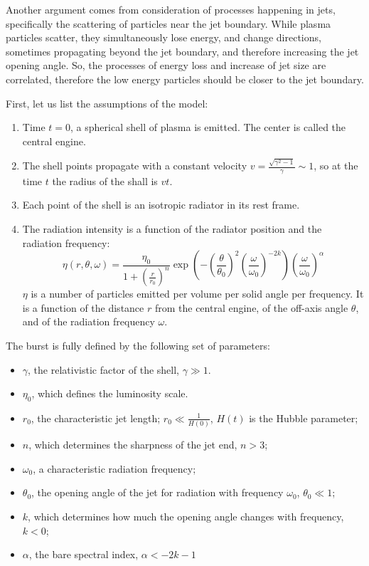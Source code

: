 \documentclass[manuscript]{aastex}
\begin{document}
Another argument comes from consideration of processes happening in
jets, specifically the scattering of particles near the jet boundary.
While plasma particles scatter, they simultaneously lose energy, and
change directions, sometimes propagating beyond the jet boundary, and
therefore increasing the jet opening angle.  So, the processes of
energy loss and increase of jet size are correlated, therefore the low
energy particles should be closer to the jet boundary.

First, let us list the assumptions of the model:

\begin{enumerate}
\item{Time $t = 0$, a spherical shell of plasma is emitted. The center
  is called the central engine.}
\item{The shell points propagate with a constant velocity $v =
  \frac{\sqrt{\gamma^2 - 1}}{\gamma} \sim 1$, so at the time $t$ the
  radius of the shall is $v t$.}
\item{Each point of the shell is an isotropic radiator in its rest
  frame.}
\item{ The radiation intensity is a function of the radiator position
  and the radiation frequency:
	\begin{equation}\label{eq:eta}
		\eta\left(r,\theta,\omega\right) = 
		\frac{\eta_0}{1 + \left(\frac{r}{r_0}\right)^n}
		\exp\left(
			-\left(\frac{\theta}{\theta_0}\right)^2
			\left(\frac{\omega}{\omega_0}\right)^{-2k}
		\right)
		\left(\frac{\omega}{\omega_0}\right)^\alpha
	\end{equation}
	$\eta$ is a number of particles emitted per volume per solid
        angle per frequency. It is a function of the distance $r$ from
        the central engine, of the off-axis angle $\theta$, and of the
        radiation frequency $\omega$.  }
\end{enumerate}

The burst is fully defined by the following set of parameters:
\begin{itemize}
\item{$\gamma$, the relativistic factor of the shell, $\gamma \gg 1$.}
\item{$\eta_0$, which defines the luminosity scale.}
\item{$r_0$, the characteristic jet length; $r_0 \ll \frac{1}{H\left(0\right)}$, $H\left(t\right)$ is the Hubble parameter;}
\item{$n$, which determines the sharpness of the jet end, $n > 3$;}
\item{$\omega_0$, a characteristic radiation frequency;}
\item{$\theta_0$, the opening angle of the jet for radiation with frequency $\omega_0$, $\theta_0 \ll 1$;}
\item{$k$, which determines how much the opening angle changes with frequency, $k < 0$;}
\item{$\alpha$, the bare spectral index, $\alpha < -2k - 1$}
\end{itemize}
\end{document}
